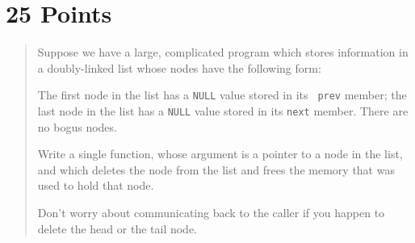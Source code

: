 

\def\brac#1{$<$#1$>$}
\def\Int{{\tt int}}
\def\int{\brac{\Int}}
\def\int{\brac{\Int}}
\def\Shortint{{\tt short~int}}
\def\shortint{\brac{\Shortint}}
\def\Longint{{\tt long~int}}
\def\longint{\brac{\Longint}}
\def\Float{{\tt float}}
\def\float{\brac{\Float}}
\def\Double{{\tt double}}
\def\double{\brac{\Double}}
\def\Char{{\tt char}}
\def\chr{\brac{\Char}}
\def\Void{{\tt void}}
\def\void{\brac{\Void}}

\def\ptr#1{pointer~to #1}
\def\p2#1{\brac{\ptr#1}}
\def\Ano#1#2{array~of {#1}~#2s}
\def\ano#1#2{\brac{\Ano#1#2}}
\def\Ao#1{array~of #1}
\def\ao#1{\brac{\Ao#1}}

\def\breakhere{\mbox{$\otimes$}}
\parskip 8pt


\topmargin -0.5in
\textheight 9in



\section{25 Points}

\begin{quotation}
\small
Suppose we have a large, complicated program which stores information in
a doubly-linked list whose nodes have the following form:

\begin{flushleft}
\verb% struct node {% \\*
\verb%   int province_code;% \\*
\verb%   int beheadment_count;% \\*
\verb%   int rioting_index;% \\*
\verb%   struct node *next; /* Pointer to next node in list */% \\*
\verb%   struct node *prev; /* Pointer to previous node in list */% \\*
\verb% } ;% 
\end{flushleft}
\label{struct}

The first node in the list has a {\tt NULL} value stored in its {\tt
prev} member; the last node in the list has a {\tt NULL} value stored in
its {\tt next} member.  There are no bogus nodes.

Write a single function, whose argument is a pointer to a node in the
list, and which deletes the node from the list and frees the memory that
was used to hold that node.

Don't worry about communicating back to the caller if you happen to
delete the head or the tail node.
\end{quotation}

